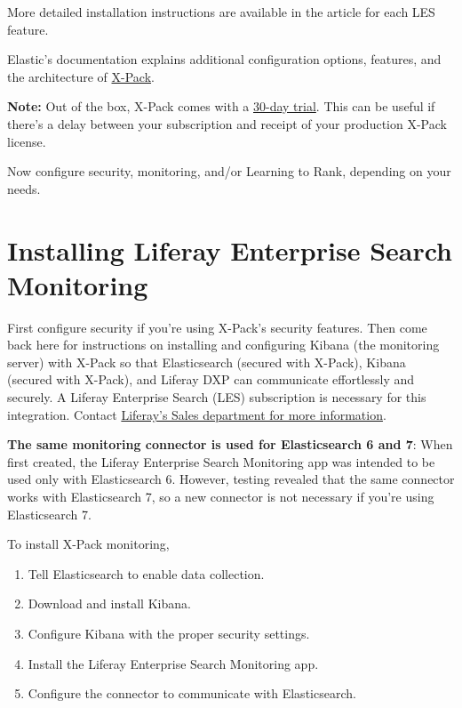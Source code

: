 More detailed installation instructions are available in the article for
each LES feature.

Elastic's documentation explains additional configuration options,
features, and the architecture of
\href{https://www.elastic.co/guide/en/elasticsearch/reference/7.x/configuring-security.html}{X-Pack}.

\noindent\hrulefill

\textbf{Note:} Out of the box, X-Pack comes with a
\href{https://www.elastic.co/guide/en/elasticsearch/reference/7.x/start-trial.html}{30-day
trial}. This can be useful if there's a delay between your subscription
and receipt of your production X-Pack license.

\noindent\hrulefill

Now configure security, monitoring, and/or Learning to Rank, depending
on your needs.

\chapter{Installing Liferay Enterprise Search
Monitoring}\label{installing-liferay-enterprise-search-monitoring}

First configure security if you're using X-Pack's security features.
Then come back here for instructions on installing and configuring
Kibana (the monitoring server) with X-Pack so that Elasticsearch
(secured with X-Pack), Kibana (secured with X-Pack), and Liferay DXP can
communicate effortlessly and securely. A Liferay Enterprise Search (LES)
subscription is necessary for this integration. Contact
\href{https://www.liferay.com/contact-us\#contact-sales}{Liferay's Sales
department for more information}.

\noindent\hrulefill

\textbf{The same monitoring connector is used for Elasticsearch 6 and
7}: When first created, the Liferay Enterprise Search Monitoring app was
intended to be used only with Elasticsearch 6. However, testing revealed
that the same connector works with Elasticsearch 7, so a new connector
is not necessary if you're using Elasticsearch 7.

\noindent\hrulefill

To install X-Pack monitoring,

\begin{enumerate}
\def\labelenumi{\arabic{enumi}.}
\item
  Tell Elasticsearch to enable data collection.
\item
  Download and install Kibana.
\item
  Configure Kibana with the proper security settings.
\item
  Install the Liferay Enterprise Search Monitoring app.
\item
  Configure the connector to communicate with Elasticsearch.
\end{enumerate}

